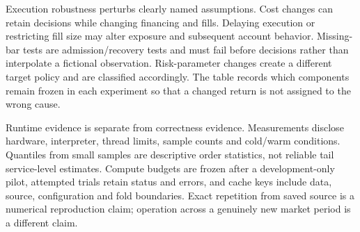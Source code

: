 Execution robustness perturbs clearly named assumptions. Cost changes can retain decisions while changing financing and fills. Delaying execution or restricting fill size may alter exposure and subsequent account behavior. Missing-bar tests are admission/recovery tests and must fail before decisions rather than interpolate a fictional observation. Risk-parameter changes create a different target policy and are classified accordingly. The table records which components remain frozen in each experiment so that a changed return is not assigned to the wrong cause.

Runtime evidence is separate from correctness evidence. Measurements disclose hardware, interpreter, thread limits, sample counts and cold/warm conditions. Quantiles from small samples are descriptive order statistics, not reliable tail service-level estimates. Compute budgets are frozen after a development-only pilot, attempted trials retain status and errors, and cache keys include data, source, configuration and fold boundaries. Exact repetition from saved source is a numerical reproduction claim; operation across a genuinely new market period is a different claim.
